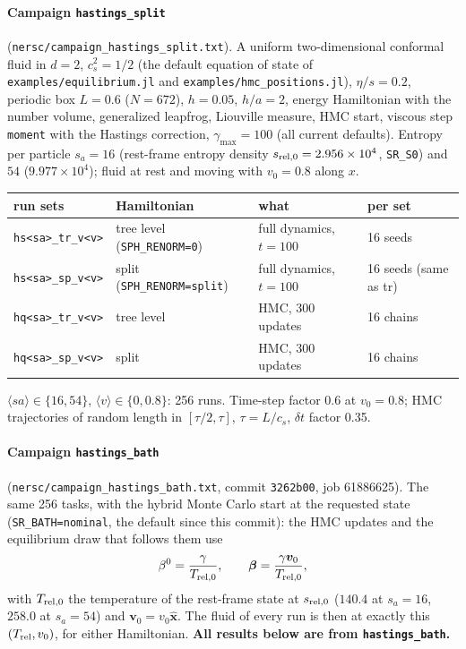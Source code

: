 \documentclass[11pt,aps,preprint,nofootinbib,superscriptaddress,tightenlines]{revtex4-2}
\def\st{\begin{equation}}
\def\stp{\end{equation}}
\let\oldparagraph\paragraph
\renewcommand{\paragraph}{\par\bigskip\oldparagraph}
\begin{document}
\paragraph{Campaign \texttt{hastings\_split}} (\texttt{nersc/campaign\_hastings\_split.txt}).  A uniform two-dimensional conformal fluid
in $d=2$, $c_s^2=1/2$ (the default equation of state of \texttt{examples/equilibrium.jl} and \texttt{examples/hmc\_positions.jl}),
$\eta/s=0.2$, periodic box $L=0.6$ ($N=672$), $h=0.05$, $h/a=2$, energy Hamiltonian with the number volume, generalized leapfrog,
Liouville measure, HMC start, viscous step \texttt{moment} with the Hastings correction, $\gamma_{\max}=100$ (all current defaults).
Entropy per particle $s_a=16$ (rest-frame entropy density $s_{\rm rel,0}=2.956\times10^4$, \texttt{SR\_S0}) and $54$ ($9.977\times10^4$); fluid at rest and moving with $v_0=0.8$ along $x$.
\begin{center}
\begin{tabular}{llll}
\toprule
run sets & Hamiltonian & what & per set \\ \midrule
\texttt{hs<sa>\_tr\_v<v>} & tree level (\texttt{SPH\_RENORM=0}) & full dynamics, $t=100$ & 16 seeds \\
\texttt{hs<sa>\_sp\_v<v>} & split (\texttt{SPH\_RENORM=split}) & full dynamics, $t=100$ & 16 seeds (same as tr) \\
\texttt{hq<sa>\_tr\_v<v>} & tree level & HMC, 300 updates & 16 chains \\
\texttt{hq<sa>\_sp\_v<v>} & split & HMC, 300 updates & 16 chains \\
\bottomrule
\end{tabular}
\end{center}
$\langle sa\rangle\in\{16,54\}$, $\langle v\rangle\in\{0,0.8\}$: 256 runs.  Time-step factor 0.6 at $v_0=0.8$; HMC trajectories of random
length in $[\tau/2,\tau]$, $\tau=L/c_s$, $\delta t$ factor 0.35.

\paragraph{Campaign \texttt{hastings\_bath}} (\texttt{nersc/campaign\_hastings\_bath.txt}, commit \texttt{3262b00}, job 61886625).
The same 256 tasks, with the hybrid Monte Carlo start at the requested state (\texttt{SR\_BATH=nominal}, the default since this commit):
the HMC updates and the equilibrium draw that follows them use
\st
\beta^0=\frac{\gamma}{T_{\rm rel,0}},\qquad \bm\beta=\frac{\gamma\bm v_0}{T_{\rm rel,0}},
\label{eq:bath}
\stp
with $T_{\rm rel,0}$ the temperature of the rest-frame state at $s_{\rm rel,0}$ ($140.4$ at $s_a=16$, $258.0$ at $s_a=54$) and $\bm v_0=v_0\hat{\bm x}$.
The fluid of every run is then at exactly this $(T_{\rm rel},v_0)$, for either Hamiltonian.  \textbf{All results below are from
\texttt{hastings\_bath}.}
\end{document}
